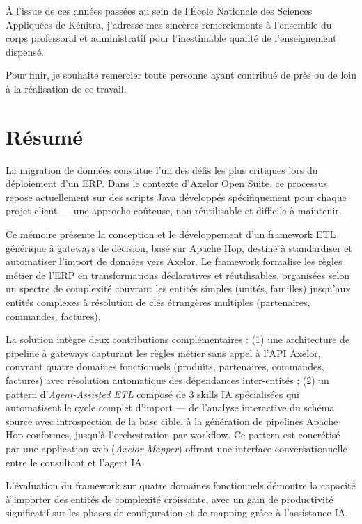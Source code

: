 \documentclass[a4paper,12pt]{article}
\begin{document}
À l'issue de ces années passées au sein de l'École Nationale des Sciences Appliquées de Kénitra, j'adresse mes sincères remerciements à l'ensemble du corps professoral et administratif pour l'inestimable qualité de l'enseignement dispensé.

Pour finir, je souhaite remercier toute personne ayant contribué de près ou de loin à la réalisation de ce travail.

\newpage
\section*{Résumé}

La migration de données constitue l'un des défis les plus critiques lors du déploiement d'un ERP. Dans le contexte d'Axelor Open Suite, ce processus repose actuellement sur des scripts Java développés spécifiquement pour chaque projet client — une approche coûteuse, non réutilisable et difficile à maintenir.

Ce mémoire présente la conception et le développement d'un framework ETL générique à gateways de décision, basé sur Apache Hop, destiné à standardiser et automatiser l'import de données vers Axelor. Le framework formalise les règles métier de l'ERP en transformations déclaratives et réutilisables, organisées selon un spectre de complexité couvrant les entités simples (unités, familles) jusqu'aux entités complexes à résolution de clés étrangères multiples (partenaires, commandes, factures).

La solution intègre deux contributions complémentaires : (1) une architecture de pipeline à gateways capturant les règles métier sans appel à l'API Axelor, couvrant quatre domaines fonctionnels (produits, partenaires, commandes, factures) avec résolution automatique des dépendances inter-entités ; (2) un pattern d'\textit{Agent-Assisted ETL} composé de 3 skills IA spécialisées qui automatisent le cycle complet d'import — de l'analyse interactive du schéma source avec introspection de la base cible, à la génération de pipelines Apache Hop conformes, jusqu'à l'orchestration par workflow. Ce pattern est concrétisé par une application web (\textit{Axelor Mapper}) offrant une interface conversationnelle entre le consultant et l'agent IA.

L'évaluation du framework sur quatre domaines fonctionnels démontre la capacité à importer des entités de complexité croissante, avec un gain de productivité significatif sur les phases de configuration et de mapping grâce à l'assistance IA.
\end{document}
